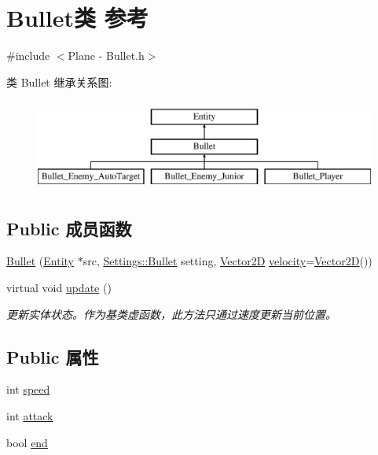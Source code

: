 \hypertarget{class_bullet}{}\section{Bullet类 参考}
\label{class_bullet}


{\ttfamily \#include $<$Plane -\/ Bullet.\+h$>$}

类 Bullet 继承关系图\+:\begin{figure}[H]
\begin{center}
\leavevmode
\includegraphics[height=3.000000cm]{class_bullet}
\end{center}
\end{figure}
\subsection*{Public 成员函数}
\begin{DoxyCompactItemize}
\item 
\hyperlink{class_bullet_ae9b56731be2ca3ff77f3a3ee4eb0bd25}{Bullet} (\hyperlink{class_entity}{Entity} $\ast$src, \hyperlink{struct_settings_1_1_bullet}{Settings\+::\+Bullet} setting, \hyperlink{_vector2_d_8hpp_aa1f1145650f1dd9bddf7335ec6434d7c}{Vector2D} \hyperlink{class_entity_a386d25b56772b8913eb3e5adc636f6e0}{velocity}=\hyperlink{_vector2_d_8hpp_aa1f1145650f1dd9bddf7335ec6434d7c}{Vector2D}())
\item 
virtual void \hyperlink{class_bullet_a32f4a0611fe2dd245fee955d14ca1f68}{update} ()
\begin{DoxyCompactList}\small\item\em 更新实体状态。作为基类虚函数，此方法只通过速度更新当前位置。 \end{DoxyCompactList}\end{DoxyCompactItemize}
\subsection*{Public 属性}
\begin{DoxyCompactItemize}
\item 
int \hyperlink{class_bullet_a110bd4348fc7547125b4ec4bbf94d5f5}{speed}
\item 
int \hyperlink{class_bullet_ab9e1e40341cddf25f8acc4e378b26f4a}{attack}
\item 
bool \hyperlink{class_bullet_aff37198e603e1a2b8ff28e0df6e156a4}{end}
\end{DoxyCompactItemize}
